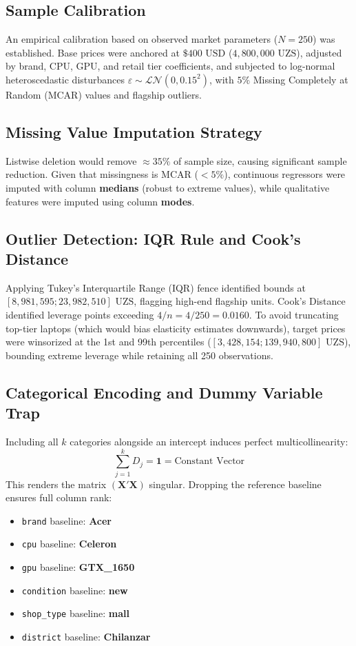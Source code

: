 \documentclass[11pt, a4paper]{article}
\begin{document}
\subsection{Sample Calibration}
An empirical calibration based on observed market parameters ($N = 250$) was established. Base prices were anchored at $\$400\text{ USD}$ ($4,800,000\text{ UZS}$), adjusted by brand, CPU, GPU, and retail tier coefficients, and subjected to log-normal heteroscedastic disturbances $\varepsilon \sim \mathcal{LN}(0, 0.15^2)$, with $5\%$ Missing Completely at Random (MCAR) values and flagship outliers.

\subsection{Missing Value Imputation Strategy}
Listwise deletion would remove $\approx 35\%$ of sample size, causing significant sample reduction. Given that missingness is MCAR ($<5\%$), continuous regressors were imputed with column \textbf{medians} (robust to extreme values), while qualitative features were imputed using column \textbf{modes}.

\subsection{Outlier Detection: IQR Rule and Cook's Distance}
Applying Tukey's Interquartile Range (IQR) fence identified bounds at $[8,981,595; 23,982,510]\text{ UZS}$, flagging high-end flagship units. Cook's Distance identified leverage points exceeding $4/n = 4/250 = 0.0160$. To avoid truncating top-tier laptops (which would bias elasticity estimates downwards), target prices were winsorized at the 1st and 99th percentiles ($[3,428,154; 139,940,800]\text{ UZS}$), bounding extreme leverage while retaining all 250 observations.

\subsection{Categorical Encoding and Dummy Variable Trap}
Including all $k$ categories alongside an intercept induces perfect multicollinearity:
\begin{equation}
\sum_{j=1}^{k} D_j = \mathbf{1} = \text{Constant Vector}
\end{equation}
This renders the matrix $(\mathbf{X}'\mathbf{X})$ singular. Dropping the reference baseline ensures full column rank:
\begin{itemize}
    \item \texttt{brand} baseline: \textbf{Acer}
    \item \texttt{cpu} baseline: \textbf{Celeron}
    \item \texttt{gpu} baseline: \textbf{GTX\_1650}
    \item \texttt{condition} baseline: \textbf{new}
    \item \texttt{shop\_type} baseline: \textbf{mall}
    \item \texttt{district} baseline: \textbf{Chilanzar}
\end{itemize}
\end{document}
